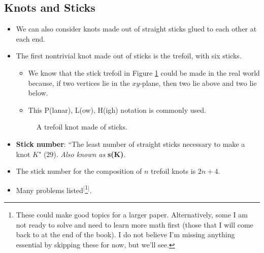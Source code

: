 \documentclass[titlepage]{article}
\numberwithin{figure}{section}
\numberwithin{table}{section}
\numberwithin{equation}{section}
\newcommand{\dq}[2]{``#1" (#2).}
\begin{document}
\subsection{Knots and Sticks}\label{sss:KnotsSticks}
\begin{itemize}
    \item We can also consider knots made out of straight sticks glued to each other at each end.
    \item The first nontrivial knot made out of sticks is the trefoil, with six sticks.
    \begin{itemize}
        \item We know that the stick trefoil in Figure \ref{fig:sticktrefoil} could be made in the real world because, if two vertices lie in the $xy$-plane, then two lie above and two lie below.
        \item This P(lanar), L(ow), H(igh) notation is commonly used.
    \end{itemize}
    \begin{figure}[h!]
        \centering
        \caption{A trefoil knot made of sticks.}
        \label{fig:sticktrefoil}
    \end{figure}
    \item \textbf{Stick number}: \dq{The least number of straight sticks necessary to make a knot $K$}{29} \emph{Also known as} \textbf{s(K)}.
    \item The stick number for the composition of $n$ trefoil knots is $2n+4$.
    \item Many problems listed$^[$\footnote{These could make good topics for a larger paper. Alternatively, some I am not ready to solve and need to learn more math first (those that I will come back to at the end of the book). I do not believe I'm missing anything essential by skipping these for now, but we'll see.}$^]$.
\end{itemize}
\newpage
\end{document}
